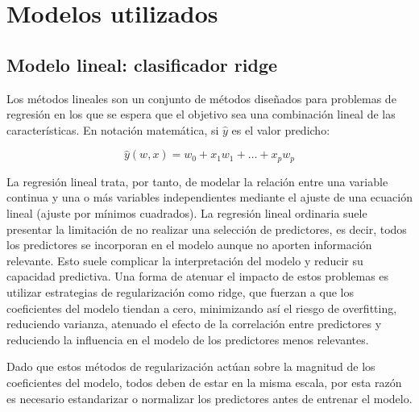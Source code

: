 
\section{Modelos utilizados}
\label{sec:models}


\subsection{Modelo lineal: clasificador ridge}

Los métodos lineales son un conjunto de métodos diseñados para problemas de regresión en los que se espera que el objetivo sea una combinación lineal de las características.
En notación matemática, si $\hat{y}$ es el valor predicho:

\begin{equation}
    \hat{y}(w,x)=w_{0} + x_{1}w_{1} + \dots + x_{p}w_{p}
\end{equation}

La regresión lineal trata, por tanto, de modelar la relación entre una variable continua y una o más variables independientes mediante el ajuste de una ecuación lineal (ajuste por mínimos cuadrados). 
La regresión lineal ordinaria suele presentar la limitación de no realizar una selección de predictores, es decir, todos los predictores se incorporan en el modelo aunque no aporten información relevante. Esto suele complicar la interpretación del modelo y reducir su capacidad predictiva.
Una forma de atenuar el impacto de estos problemas es utilizar estrategias de regularización como ridge, que fuerzan a que los coeficientes del modelo tiendan a cero, minimizando así el riesgo de overfitting, reduciendo varianza, atenuado el efecto de la correlación entre predictores y reduciendo la influencia en el modelo de los predictores menos relevantes.

Dado que estos métodos de regularización actúan sobre la magnitud de los coeficientes del modelo, todos deben de estar en la misma escala, por esta razón es necesario estandarizar o normalizar los predictores antes de entrenar el modelo.

